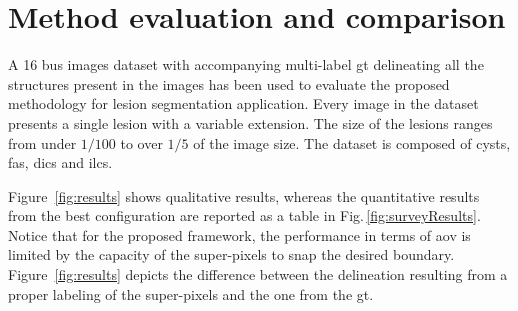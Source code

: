 \graphicspath{ {./content/results/figures/} }



\section{Method evaluation and comparison} 
A 16 \ac{bus} images dataset with accompanying multi-label \ac{gt} delineating all the structures present in the images has been used to evaluate the proposed methodology for lesion segmentation application.
Every image in the dataset presents a single lesion with a variable extension. 
The size of the lesions ranges from under $1/100$ to over $1/5$ of the image size.
The dataset is composed of cysts, \acp{fa}, \acp{dic} and \acp{ilc}.

Figure~\ref{fig:results} shows  qualitative results, whereas the quantitative results from the best configuration are reported as a table in Fig.\,\ref{fig:surveyResults}. %
Notice that for the proposed framework, the performance in terms of \ac{aov} is limited by the capacity of the super-pixels to snap the desired boundary.
Figure~\ref{fig:results} depicts the difference between the delineation resulting from a proper labeling of the super-pixels and the one from the \ac{gt}.

